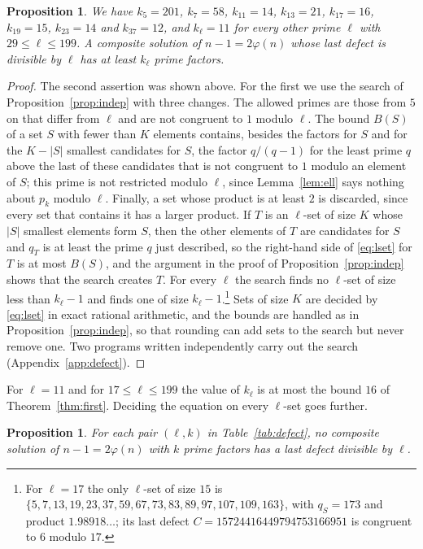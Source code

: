 \documentclass[11pt,reqno]{amsart}
\numberwithin{equation}{section}
\theoremstyle{plain}
\newtheorem{proposition}[theorem]{Proposition}
\theoremstyle{definition}
\theoremstyle{remark}
\begin{document}
\begin{proposition}\label{prop:kell}
We have $k_5=201$, $k_7=58$, $k_{11}=14$, $k_{13}=21$, $k_{17}=16$,
$k_{19}=15$, $k_{23}=14$ and $k_{37}=12$, and $k_\ell=11$ for every
other prime $\ell$ with $29\le\ell\le199$. A composite solution of
$n-1=2\varphi(n)$ whose last defect is divisible by $\ell$ has at least
$k_\ell$ prime factors.
\end{proposition}

\begin{proof}
The second assertion was shown above. For the first we use the search
of Proposition~\ref{prop:indep} with three changes. The allowed primes
are those from $5$ on that differ from $\ell$ and are not congruent to
$1$ modulo $\ell$. The bound $B(S)$ of a set $S$ with fewer than $K$
elements contains, besides the factors for $S$ and for the $K-|S|$
smallest candidates for $S$, the factor $q/(q-1)$ for the least prime
$q$ above the last of these candidates that is not congruent to $1$
modulo an element of $S$; this prime is not restricted modulo $\ell$,
since Lemma~\ref{lem:ell} says nothing about $p_k$ modulo $\ell$.
Finally, a set whose product is at least $2$ is discarded, since every
set that contains it has a larger product. If $T$ is an $\ell$-set of
size $K$ whose $|S|$ smallest elements form $S$, then the other
elements of $T$ are candidates for $S$ and $q_T$ is at least the prime
$q$ just described, so the right-hand side of \eqref{eq:lset} for $T$
is at most $B(S)$, and the argument in the proof of
Proposition~\ref{prop:indep} shows that the search creates $T$. For
every $\ell$ the search finds no $\ell$-set of size less than
$k_\ell-1$ and finds one of size $k_\ell-1$.\footnote{For $\ell=17$ the
only $\ell$-set of size $15$ is
$\{5,7,13,19,23,37,59,67,73,83,89,97,107,109,163\}$, with $q_S=173$ and
product $1.98918\ldots$; its last defect
$C=15724416449794753166951$ is congruent to $6$ modulo $17$.} Sets of
size $K$ are decided by \eqref{eq:lset} in exact rational arithmetic,
and the bounds are handled as in Proposition~\ref{prop:indep}, so that
rounding can add sets to the search but never remove one. Two programs
written independently carry out the search
(Appendix~\ref{app:defect}).
\end{proof}

For $\ell=11$ and for $17\le\ell\le199$ the value of $k_\ell$ is at most the
bound $16$ of Theorem~\ref{thm:first}. Deciding the equation on every
$\ell$-set goes further.

\begin{proposition}\label{prop:defectk}
For each pair $(\ell,k)$ in Table~\ref{tab:defect}, no composite
solution of $n-1=2\varphi(n)$ with $k$ prime factors has a last defect
divisible by $\ell$.
\end{proposition}
\end{document}

